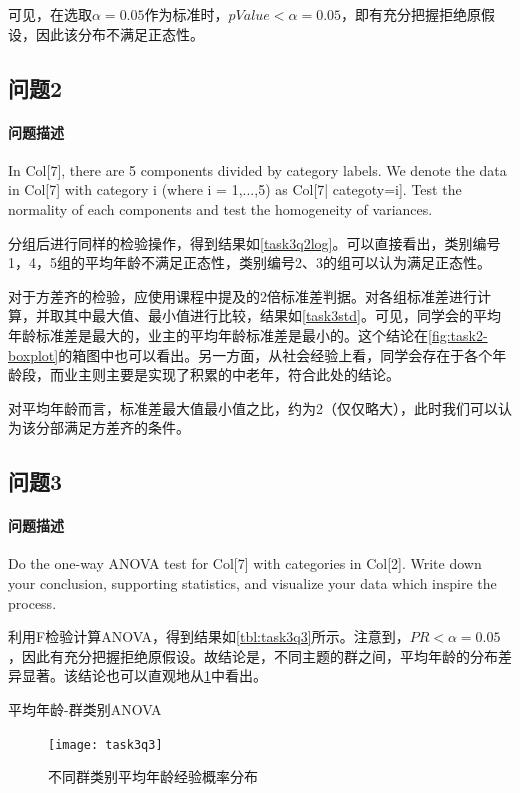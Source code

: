 \documentclass[a4paper,12pt]{article}
\begin{document}
    可见，在选取$\alpha=0.05$作为标准时，$pValue<\alpha=0.05$，即有充分把握拒绝原假设，因此该分布不满足正态性。

    \subsection{问题2} %
    \paragraph{问题描述} In Col[7], there are 5 components divided by category labels. We denote the data in Col[7] with category i (where i = 1,...,5) as Col[7| categoty=i]. Test the normality of each components and test the homogeneity of variances.

    分组后进行同样的检验操作，得到结果如\cref{task3q2log}。可以直接看出，类别编号1，4，5组的平均年龄不满足正态性，类别编号2、3的组可以认为满足正态性。
    

    对于方差齐的检验，应使用课程中提及的2倍标准差判据\cite{anova}。对各组标准差进行计算，并取其中最大值、最小值进行比较，结果如\cref{task3std}。可见，同学会的平均年龄标准差是最大的，业主的平均年龄标准差是最小的。这个结论在\cref{fig:task2-boxplot}的箱图中也可以看出。另一方面，从社会经验上看，同学会存在于各个年龄段，而业主则主要是实现了积累的中老年，符合此处的结论。
    

    对平均年龄而言，标准差最大值最小值之比，约为2（仅仅略大），此时我们可以认为该分部满足方差齐的条件。

    \subsection{问题3}
    \paragraph{问题描述} Do the one-way ANOVA test for Col[7] with categories in Col[2]. Write down your conclusion, supporting statistics, and visualize your data which inspire the process.

    利用F检验计算ANOVA，得到结果如\cref{tbl:task3q3}所示。注意到，$PR<\alpha=0.05$，因此有充分把握拒绝原假设。故结论是，不同主题的群之间，平均年龄的分布差异显著。该结论也可以直观地从\cref{fig:task3q3}中看出。
    \begin{table}
      \centering
      \caption{平均年龄-群类别ANOVA}
      \label{tbl:task3q3}
      
    \end{table}
    \begin{figure}
      \centering
      \texttt{[image: task3q3]}
      \caption{不同群类别平均年龄经验概率分布}
      \label{fig:task3q3}
    \end{figure}
\end{document}
